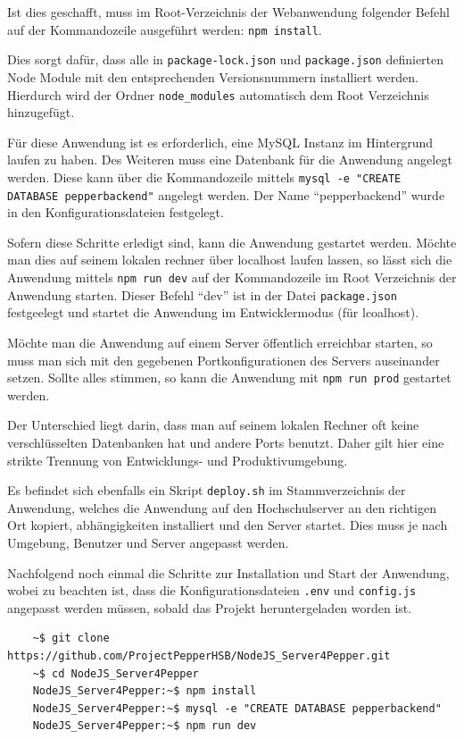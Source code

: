 Ist dies geschafft, muss im Root-Verzeichnis der Webanwendung folgender Befehl auf der Kommandozeile ausgeführt werden:
\verb|npm install|.

Dies sorgt dafür, dass alle in \verb|package-lock.json| und \verb|package.json| definierten Node Module mit den entsprechenden
Versionsnummern installiert werden. Hierdurch wird der Ordner \verb|node_modules| automatisch dem Root Verzeichnis hinzugefügt.

Für diese Anwendung ist es erforderlich, eine MySQL Instanz im Hintergrund laufen zu haben. Des Weiteren muss eine Datenbank
für die Anwendung angelegt werden. Diese kann über die Kommandozeile mittels \verb|mysql -e "CREATE DATABASE pepperbackend"|
angelegt werden. Der Name ``pepperbackend'' wurde in den Konfigurationsdateien festgelegt.

Sofern diese Schritte erledigt sind, kann die Anwendung gestartet werden. Möchte man dies auf seinem lokalen rechner über
localhost laufen lassen, so lässt sich die Anwendung mittels \verb|npm run dev| auf der Kommandozeile im Root Verzeichnis
der Anwendung starten. Dieser Befehl ``dev'' ist in der Datei \verb|package.json| festgeelegt und startet die Anwendung im
Entwicklermodus (für lcoalhost).

Möchte man die Anwendung auf einem Server öffentlich erreichbar starten, so muss man sich mit den gegebenen Portkonfigurationen
des Servers auseinander setzen. Sollte alles stimmen, so kann die Anwendung mit \verb|npm run prod| gestartet werden.

Der Unterschied liegt darin, dass man auf seinem lokalen Rechner oft keine verschlüsselten Datenbanken hat und andere Ports benutzt.
Daher gilt hier eine strikte Trennung von Entwicklungs- und Produktivumgebung.

Es befindet sich ebenfalls ein Skript \verb|deploy.sh| im Stammverzeichnis der Anwendung, welches die Anwendung auf den Hochschulserver
an den richtigen Ort kopiert, abhängigkeiten installiert und den Server startet. Dies muss je nach Umgebung, Benutzer und Server
angepasst werden.

Nachfolgend noch einmal die Schritte zur Installation und Start der Anwendung, wobei zu beachten ist,
dass die Konfigurationsdateien \verb|.env| und \verb|config.js| angepasst werden müssen, sobald das Projekt heruntergeladen
worden ist.
\begin{lstlisting}
    ~$ git clone https://github.com/ProjectPepperHSB/NodeJS_Server4Pepper.git 
    ~$ cd NodeJS_Server4Pepper
    NodeJS_Server4Pepper:~$ npm install
    NodeJS_Server4Pepper:~$ mysql -e "CREATE DATABASE pepperbackend"
    NodeJS_Server4Pepper:~$ npm run dev
\end{lstlisting}
\\

